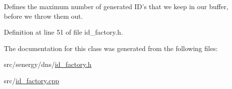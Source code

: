 Defines the maximum number of generated I\-D's that we keep in our buffer, before we throw them out. 



Definition at line 51 of file id\-\_\-factory.\-h.



The documentation for this class was generated from the following files\-:\begin{DoxyCompactItemize}
\item 
src/senergy/dns/\hyperlink{id__factory_8h}{id\-\_\-factory.\-h}\item 
src/\hyperlink{id__factory_8cpp}{id\-\_\-factory.\-cpp}\end{DoxyCompactItemize}
